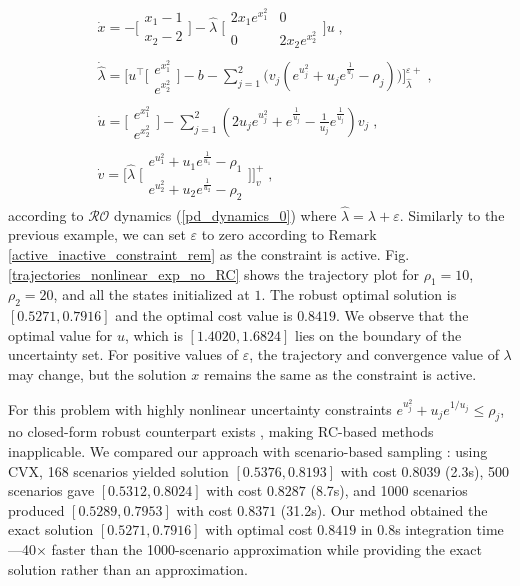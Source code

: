 \documentclass[journal,twoside,web]{ieeecolor}
\newcommand{\rev}[1]{\textcolor{revisionblue}{#1}}
\begin{document}
\begin{align*}
&\dot x=-\Big[\begin{array}{ccl} x_1-1 \\ x_2-2 \end{array}\Big]-\hat{\lambda}\; \Big[\begin{array}{cc} 2 x_1 e^{x_1^2} & 0 \\ 0 & 2 x_2 e^{x_2^2}\end{array}\Big]u \nonumber\;,\\
&\dot {\hat{\lambda}} = \Big[u^\top \Big[\begin{array}{cc} e^{x_1^2}\\ e^{x_2^2}\end{array}\Big]-b- \sum_{j=1}^2 \big(v_j(e^{u_j^2}+u_j e^{\frac{1}{u_j}}-\rho_j)\big)\Big]_{\hat{\lambda}}^{\varepsilon+}\nonumber\;,\\
&\dot u=\Big[\begin{array}{cc} e^{x_1^2}\\ e^{x_2^2}\end{array}\Big]- \sum_{j=1}^2(2u_j e^{u_j^2}+e^{\frac{1}{u_j}}-\frac{1}{u_j} e^{\frac{1}{u_j}}) v_j\nonumber\;,\\
&\dot v=\Big[\hat{\lambda}\; \Big[\begin{array}{cc} e^{u_1^2}+u_1 e^{\frac{1}{u_1}}-\rho_1 \\ e^{u_2^2}+u_2 e^{\frac{1}{u_2}}-\rho_2 \end{array}\Big] \Big]_{v}^+\nonumber\;,
\end{align*}
according to $\mathcal{RO}$ dynamics (\ref{pd_dynamics_0}) where $\hat{\lambda}=\lambda+\varepsilon$. Similarly to the previous example, we can set $\varepsilon$ to zero according to Remark \ref{active_inactive_constraint_rem} as the constraint is active. Fig. \ref{trajectories_nonlinear_exp_no_RC} shows the trajectory plot for $\rho_1=10$, $\rho_2=20$, and all the states initialized at $1$. The robust optimal solution is $[0.5271, 0.7916]$ and the optimal cost value is $0.8419$. We observe that the optimal value for $u$, which is $[1.4020, 1.6824]$ lies on the boundary of the uncertainty set. For positive values of $\varepsilon$, the trajectory and convergence value of $\lambda$ may change, but the solution $x$ remains the same as the constraint is active.

\rev{For this problem with highly nonlinear uncertainty constraints $e^{u_j^2}+u_j e^{1/u_j} \leq \rho_j$, no closed-form robust counterpart exists \cite{bental2009,gorissen20152}, making RC-based methods inapplicable. We compared our approach with scenario-based sampling \cite{calafiore2004}: using CVX, 168 scenarios yielded solution $[0.5376, 0.8193]$ with cost $0.8039$ (2.3s), 500 scenarios gave $[0.5312, 0.8024]$ with cost $0.8287$ (8.7s), and 1000 scenarios produced $[0.5289, 0.7953]$ with cost $0.8371$ (31.2s). Our method obtained the exact solution $[0.5271, 0.7916]$ with optimal cost $0.8419$ in 0.8s integration time—40× faster than the 1000-scenario approximation while providing the exact solution rather than an approximation.}
\end{document}
